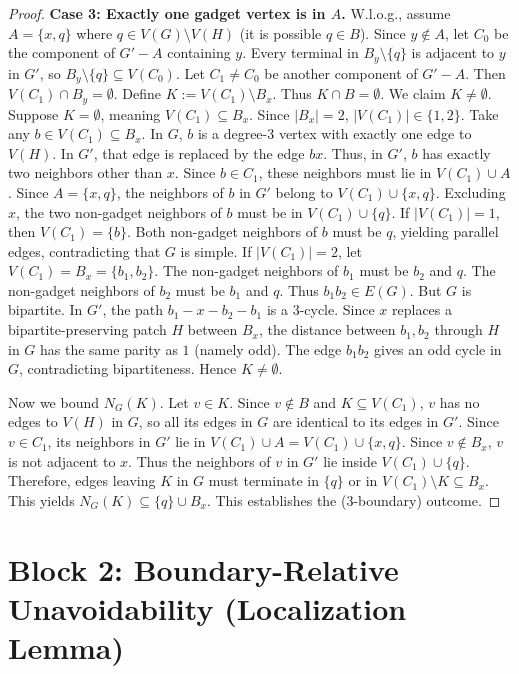 \documentclass[12pt]{article}
\begin{document}
\begin{proof}
\textbf{Case 3: Exactly one gadget vertex is in $A$.}
W.l.o.g., assume $A = \{x,q\}$ where $q \in V(G) \setminus V(H)$ (it is possible $q \in B$).
Since $y \notin A$, let $C_0$ be the component of $G'-A$ containing $y$. Every terminal in $B_y \setminus \{q\}$ is adjacent to $y$ in $G'$, so $B_y \setminus \{q\} \subseteq V(C_0)$.
Let $C_1 \neq C_0$ be another component of $G'-A$. Then $V(C_1) \cap B_y = \emptyset$.
Define $K := V(C_1) \setminus B_x$. Thus $K \cap B = \emptyset$.
We claim $K \neq \emptyset$. Suppose $K = \emptyset$, meaning $V(C_1) \subseteq B_x$. Since $|B_x|=2$, $|V(C_1)| \in \{1,2\}$.
Take any $b \in V(C_1) \subseteq B_x$. In $G$, $b$ is a degree-3 vertex with exactly one edge to $V(H)$. In $G'$, that edge is replaced by the edge $bx$. Thus, in $G'$, $b$ has exactly two neighbors other than $x$. Since $b \in C_1$, these neighbors must lie in $V(C_1) \cup A$.
Since $A=\{x,q\}$, the neighbors of $b$ in $G'$ belong to $V(C_1) \cup \{x,q\}$. Excluding $x$, the two non-gadget neighbors of $b$ must be in $V(C_1) \cup \{q\}$.
If $|V(C_1)|=1$, then $V(C_1)=\{b\}$. Both non-gadget neighbors of $b$ must be $q$, yielding parallel edges, contradicting that $G$ is simple.
If $|V(C_1)|=2$, let $V(C_1) = B_x = \{b_1, b_2\}$. The non-gadget neighbors of $b_1$ must be $b_2$ and $q$. The non-gadget neighbors of $b_2$ must be $b_1$ and $q$. Thus $b_1 b_2 \in E(G)$.
But $G$ is bipartite. In $G'$, the path $b_1-x-b_2-b_1$ is a 3-cycle. Since $x$ replaces a bipartite-preserving patch $H$ between $B_x$, the distance between $b_1,b_2$ through $H$ in $G$ has the same parity as $1$ (namely odd). The edge $b_1 b_2$ gives an odd cycle in $G$, contradicting bipartiteness.
Hence $K \neq \emptyset$.

Now we bound $N_G(K)$. Let $v \in K$. Since $v \notin B$ and $K \subseteq V(C_1)$, $v$ has no edges to $V(H)$ in $G$, so all its edges in $G$ are identical to its edges in $G'$. Since $v \in C_1$, its neighbors in $G'$ lie in $V(C_1) \cup A = V(C_1) \cup \{x,q\}$. Since $v \notin B_x$, $v$ is not adjacent to $x$. Thus the neighbors of $v$ in $G'$ lie inside $V(C_1) \cup \{q\}$. Therefore, edges leaving $K$ in $G$ must terminate in $\{q\}$ or in $V(C_1) \setminus K \subseteq B_x$. This yields $N_G(K) \subseteq \{q\} \cup B_x$.
This establishes the (3-boundary) outcome.
\end{proof}

\section*{Block 2: Boundary-Relative Unavoidability (Localization Lemma)}
\end{document}
